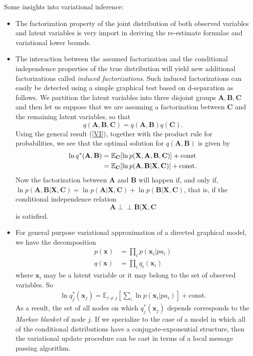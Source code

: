 \documentclass[a4paper]{report}
\def\ci{\perp\!\!\!\perp}
\newcommand{\up}{\mathrm}
\renewcommand{\bf}{\mathbf}
\newcommand{\bb}{\mathbb}
\newcommand{\imp}[1]{{\color{blue}\textit{#1}}}
\begin{document}
Some insights into variational inference:
\begin{itemize}
	\item The factorization property of the joint distribution of both observed variables and latent variables is very import in deriving the re-estimate formulae and variational lower bounds.
	\item The interaction between the assumed factorization and the conditional independence properties of the true distribution will yield new additional factorizations called \imp{induced factorizations}. Such induced factorizations can easily be detected using a simple graphical test based on d-separation as follows. We partition the latent variables into three disjoint groups $\bf{A,B,C}$ and then let us suppose that we are assuming a factorization between $\bf{C}$ and the remaining latent variables, so that
	\begin{equation}
		q(\bf{A,B,C}) = q(\bf{A,B}) q(\bf{C}).
	\end{equation}
	Using the general result (\ref{VI}), together with the product rule for probabilities, we see that the optimal solution for $q(\bf{A,B})$ is given by
	\begin{align}
		\ln q^*(\bf{A,B}) &= \bb{E}_{\bf{C}}[\ln p(\bf{X,A,B,C})] + \up{const} \notag \\
		&= \bb{E}_{\bf{C}}[\ln p(\bf{A,B|X,C})] + \up{const}.
	\end{align}
	Now the factorization between $\bf{A}$ and $\bf{B}$ will happen if, and only if, $\ln p(\bf{A,B|X,C}) = \ln p(\bf{A|X,C})+\ln p(\bf{B|X,C})$, that is, if the conditional independence relation
	\begin{equation}
		\bf{A \ci B|X,C}
	\end{equation}
	is satisfied. 
	\item For general purpose variational approximation of a directed graphical model, we have the decomposition
	\begin{align}
		p(\bf{x}) &= \prod_i p(\bf{x}_i|pa_i) \\
		q(\bf{x}) &= \prod_i q_i(\bf{x}_i)
	\end{align}
	where $\bf{x}_i$ may be a latent variable or it may belong to the set of observed variables.
	So
	\begin{align}
		\ln q_j^*(\bf{x}_j) = \bb{E}_{i \neq j}\left[ \sum_i \ln p(\bf{x}_i|pa_i) \right] + \up{const}.
	\end{align}
	As a result, the set of all nodes on which $q_j^*(\bf{x}_j)$ depends corresponds to the \imp{Markov blanket} of node $j$. If we specialize to the case of a model in which all of the conditional distributions have a conjugate-exponential structure, then the variational update procedure can be cast in terms of a local message passing algorithm.	
\end{itemize}
\end{document}
